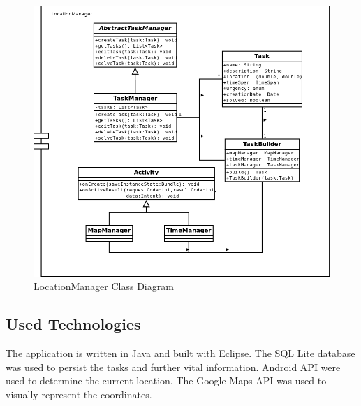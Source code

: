  \begin{figure}[h!]
  \caption{LocationManager Class Diagram}
  \center
  	\includegraphics[scale=0.5]{../resources/ClassDiagram.png}
\end{figure}
\newpage
\subsection{Used Technologies}
The application is written in Java and built with Eclipse. The SQL Lite database
was used to persist the tasks and further vital information. Android API were
used to determine the current location. The Google Maps API was used to visually
represent the coordinates.